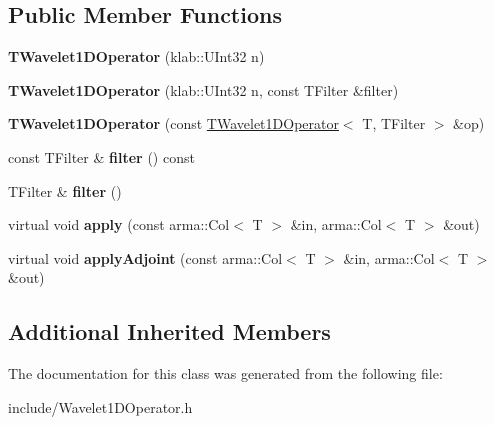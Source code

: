 \subsection*{Public Member Functions}
\begin{DoxyCompactItemize}
\item 
{\bfseries T\+Wavelet1\+D\+Operator} (klab\+::\+U\+Int32 n)\hypertarget{classkl1p_1_1TWavelet1DOperator_a2100c9752f6e44b7a4acf4c0f5ec5b37}{}\label{classkl1p_1_1TWavelet1DOperator_a2100c9752f6e44b7a4acf4c0f5ec5b37}

\item 
{\bfseries T\+Wavelet1\+D\+Operator} (klab\+::\+U\+Int32 n, const T\+Filter \&filter)\hypertarget{classkl1p_1_1TWavelet1DOperator_ad2c45c1fbee051a302cbaeec84e61c27}{}\label{classkl1p_1_1TWavelet1DOperator_ad2c45c1fbee051a302cbaeec84e61c27}

\item 
{\bfseries T\+Wavelet1\+D\+Operator} (const \hyperlink{classkl1p_1_1TWavelet1DOperator}{T\+Wavelet1\+D\+Operator}$<$ T, T\+Filter $>$ \&op)\hypertarget{classkl1p_1_1TWavelet1DOperator_a28891f1452f2221cd1dc6ba7f6472360}{}\label{classkl1p_1_1TWavelet1DOperator_a28891f1452f2221cd1dc6ba7f6472360}

\item 
const T\+Filter \& {\bfseries filter} () const \hypertarget{classkl1p_1_1TWavelet1DOperator_a2b89077708bdef057cdbac6760ced0c0}{}\label{classkl1p_1_1TWavelet1DOperator_a2b89077708bdef057cdbac6760ced0c0}

\item 
T\+Filter \& {\bfseries filter} ()\hypertarget{classkl1p_1_1TWavelet1DOperator_a2a7984b53b62b47c3ef9ecdd17c97e88}{}\label{classkl1p_1_1TWavelet1DOperator_a2a7984b53b62b47c3ef9ecdd17c97e88}

\item 
virtual void {\bfseries apply} (const arma\+::\+Col$<$ T $>$ \&in, arma\+::\+Col$<$ T $>$ \&out)\hypertarget{classkl1p_1_1TWavelet1DOperator_aa11718d9e9d33137ccbe0cc69af89402}{}\label{classkl1p_1_1TWavelet1DOperator_aa11718d9e9d33137ccbe0cc69af89402}

\item 
virtual void {\bfseries apply\+Adjoint} (const arma\+::\+Col$<$ T $>$ \&in, arma\+::\+Col$<$ T $>$ \&out)\hypertarget{classkl1p_1_1TWavelet1DOperator_afa4d349959406e9ed792a710448b21af}{}\label{classkl1p_1_1TWavelet1DOperator_afa4d349959406e9ed792a710448b21af}

\end{DoxyCompactItemize}
\subsection*{Additional Inherited Members}


The documentation for this class was generated from the following file\+:\begin{DoxyCompactItemize}
\item 
include/Wavelet1\+D\+Operator.\+h\end{DoxyCompactItemize}
